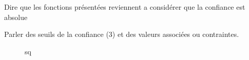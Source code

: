 Dire que les fonctions présentées reviennent a considérer que la
confiance est absolue

Parler des seuils de la confiance (3) et des valeurs associées ou
contraintes.


\begin{figure}
  \centering
  
  \caption{sq}
  \label{fig:qs}
\end{figure}




\begin{figure}
  \centering
\end{figure}




